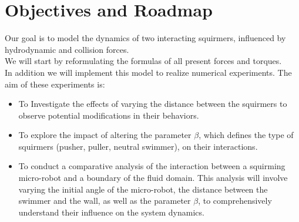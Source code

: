 \documentclass{article}
\begin{document}
\section{Objectives and Roadmap}
Our goal is to model the dynamics of two interacting squirmers, influenced by hydrodynamic \cite{Brumley} and collision forces.\\
We will start by reformulating the formulas of all present forces and torques.\cite{Brumley}\cite{Lauga}\\
In addition we will implement this model to realize numerical experiments. The aim of these experiments is: 
\begin{itemize}
    \item To Investigate the effects of varying the distance between the squirmers to observe
    potential modifications in their behaviors.
    \item To explore the impact of altering the parameter $\beta$, which defines the
    type of squirmers (pusher, puller, neutral swimmer), on their interactions.
    \item To conduct a comparative analysis of the interaction between a squirming micro-robot and a 
    boundary of the fluid domain. This analysis will involve varying the initial angle of the micro-robot, the distance between the swimmer and the wall, as well as the parameter $\beta$, 
    to comprehensively understand their influence on the system dynamics.
\end{itemize}
\end{document}
